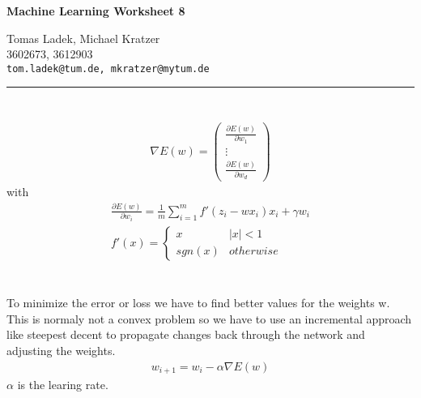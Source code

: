 \documentclass[11pt]{article}
\makeatletter
\newcommand{\exercise}{\section{}}
\newcommand{\hwhead}[4]{
\begin{center}
\sffamily\large\bfseries Machine Learning Worksheet #1
\vspace{2mm}
\normalfont

#2\\
#3\\
\texttt{#4}
\end{center}
\vspace{6mm} \hrule \vspace{4mm}
}
\newcommand{\names}{Tomas Ladek, Michael Kratzer} %
\newcommand{\imats}{3602673, 3612903} %
\newcommand{\emails}{tom.ladek@tum.de, mkratzer@mytum.de} %
\makeatother
\begin{document}
\hwhead{8}{\names}{\imats}{\emails}


\exercise
\begin{align*}
	\nabla E(w) = \begin{pmatrix}
		\frac{\partial E(w)}{\partial w_1} \\
		\vdots \\
		\frac{\partial E(w)}{\partial w_d}
	\end{pmatrix}
\end{align*}
with
\begin{align*}
	\frac{\partial E(w)}{\partial w_i} = \frac{1}{m}\sum_{i=1}^{m}f'(z_i -wx_i)x_i + \gamma w_i \\
	f'(x) = \begin{cases}
		x  & |x|<1 \\
		sgn(x) & otherwise
	\end{cases}
\end{align*}

\exercise
To minimize the error or loss we have to find better values for the weights w. This is normaly not a convex problem so we have to use an incremental approach like steepest decent to propagate changes back through the network and adjusting the weights.
\begin{align}
	w_{i+1} = w_i - \alpha \nabla E(w)
\end{align}
$\alpha$ is the learing rate.
\end{document}
